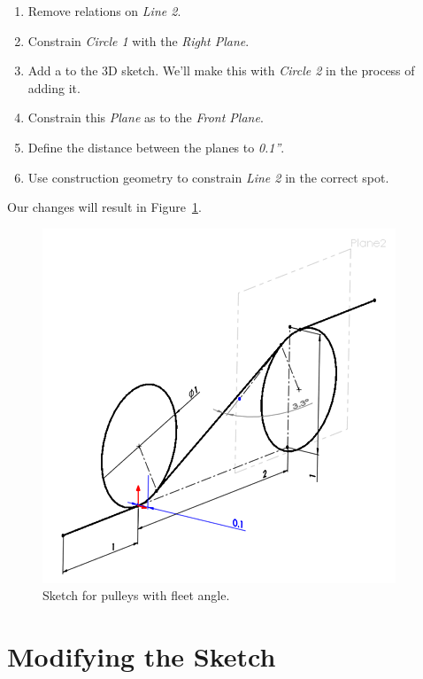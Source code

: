 \begin{enumerate}
\item{} Remove  relations on \emph{Line 2}.
\item{} Constrain \emph{Circle 1}  with the \emph{Right Plane}.
\item{} Add a   to the 3D sketch. We'll make this  with
\emph{Circle 2} in the process of adding it.
\item{} Constrain this \emph{Plane} as  to the \emph{Front Plane}.
\item{} Define the distance between the planes to \emph{0.1''}.
\item{} Use construction geometry to constrain \emph{Line 2} in the correct spot.
\end{enumerate}

Our changes will result in Figure~\ref{fig:non-tangential-3d-sketch}.

\begin{figure}[H]
\begin{center}
\includegraphics{images/figures/non-tangential-3d-sketch.png}
\end{center}
\caption{Sketch for pulleys with fleet angle.
\label{fig:non-tangential-3d-sketch}}

\end{figure}

\section{Modifying the Sketch}

